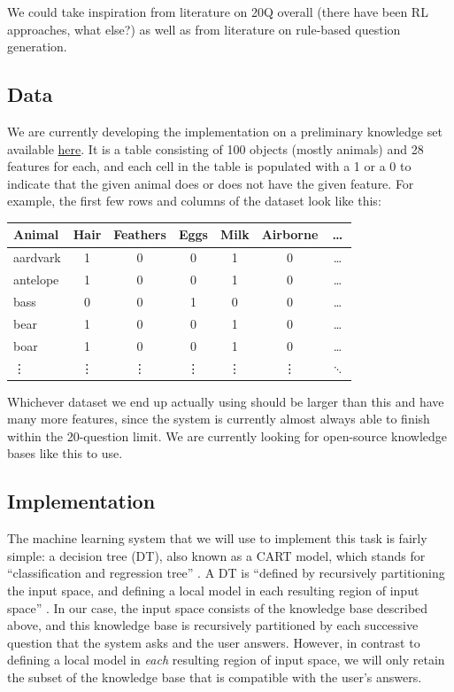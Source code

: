 \documentclass[a4paper,12pt]{article}
\begin{document}
We could take inspiration from literature on 20Q overall (there have been RL approaches, what else?) as well as from literature on rule-based question generation.

\subsection*{Data}
We are currently developing the implementation on a preliminary knowledge set available \href{https://github.com/drdevinhopkins/20_Questions/blob/master/knowledge_base.csv}{here}.
It is a table consisting of 100 objects (mostly animals) and 28 features for each, and each cell in the table is populated with a 1 or a 0 to indicate that the given animal does or does not have the given feature.
For example, the first few rows and columns of the dataset look like this:

\begin{center}
	\begin{tabular}{lcccccc}
	\toprule
Animal & Hair & Feathers & Eggs & Milk & Airborne & \ldots \\ \midrule
aardvark & 1 & 0 & 0 & 1 & 0 & \ldots \\
antelope & 1 & 0 & 0 & 1 & 0 & \ldots \\
bass & 0 & 0 & 1 & 0 & 0 & \ldots \\
bear & 1 & 0 & 0 & 1 & 0 & \ldots \\
boar & 1 & 0 & 0 & 1 & 0 & \ldots \\
\vdots & \vdots & \vdots & \vdots & \vdots & \vdots & $\ddots$ \\
\bottomrule
\end{tabular}
\end{center}

Whichever dataset we end up actually using should be larger than this and have many more features, since the system is currently almost always able to finish within the 20-question limit.
We are currently looking for open-source knowledge bases like this to use.

\subsection*{Implementation}

The machine learning system that we will use to implement this task is fairly simple: a decision tree (DT), also known as a CART model, which stands for ``classification and regression tree'' \citep[Section 16.2]{Murphy2012}.
A DT is ``defined by recursively partitioning the input space, and defining a local model in each resulting region of input space'' \citep[545]{Murphy2012}.
In our case, the input space consists of the knowledge base described above, and this knowledge base is recursively partitioned by each successive question that the system asks and the user answers.
However, in contrast to defining a local model in \textit{each} resulting region of input space, we will only retain the subset of the knowledge base that is compatible with the user's answers.
\end{document}
